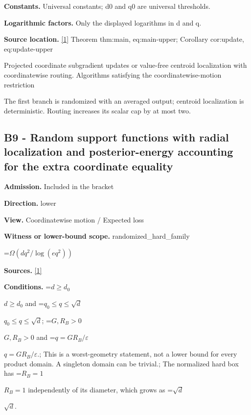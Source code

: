 \documentclass[10pt,a4paper]{article}
\newcommand{\AtlasMath}[1]{\par\begingroup\centering\setbox0=\hbox{$\displaystyle #1$}\ifdim\wd0>1.4\linewidth\typeout{ATLAS WIDE FORMULA: \the\wd0}\fi\ifdim\wd0>\linewidth\resizebox{\linewidth}{!}{\box0}\else\box0\fi\par\endgroup}
\newcommand{\AtlasInlineMath}[1]{\begingroup\setbox0=\hbox{$#1$}\ifdim\wd0>.4\linewidth\endgroup\AtlasMath{#1}\else\endgroup$#1$\fi}
\begin{document}
\textbf{Constants.} Universal constants; d0 and q0 are universal thresholds.



\textbf{Logarithmic factors.} Only the displayed logarithms in d and q.



\textbf{Source location.} \href{https://github.com/WU-Wendao/Colombo/blob/main/colombo_sensorium/Complexity_altas/data/sources/colombo/U03/manuscript.pdf}{[1]} Theorem thm:main, eq:main-upper; Corollary cor:update, eq:update-upper



Projected coordinate subgradient updates or value-free centroid localization with coordinatewise routing. Algorithms satisfying the coordinatewise-motion restriction



The first branch is randomized with an averaged output; centroid localization is deterministic. Routing increases its scalar cap by at most two.



\subsection{B9 - Random support functions with radial localization and posterior-energy accounting for the extra coordinate equality}


\textbf{Admission.} Included in the bracket



\textbf{Direction.} lower



\textbf{View.} Coordinatewise motion / Expected loss



\textbf{Witness or lower-bound scope.} randomized\_hard\_family



\AtlasMath{\Omega(dq^2/\log(eq^2))}


\textbf{Sources.} \href{https://github.com/WU-Wendao/Colombo/blob/main/colombo_sensorium/Complexity_altas/data/sources/colombo/U03/manuscript.pdf}{[1]}



\textbf{Conditions.} \AtlasInlineMath{d\ge d_0} and \AtlasInlineMath{q_0\le q\le\sqrt d}; \AtlasInlineMath{G,R_B>0} and \AtlasInlineMath{q=GR_B/\varepsilon}.; This is a worst-geometry statement, not a lower bound for every product domain. A singleton domain can be trivial.; The normalized hard box has \AtlasInlineMath{R_B=1} independently of its diameter, which grows as \AtlasInlineMath{\sqrt d}.
\end{document}
